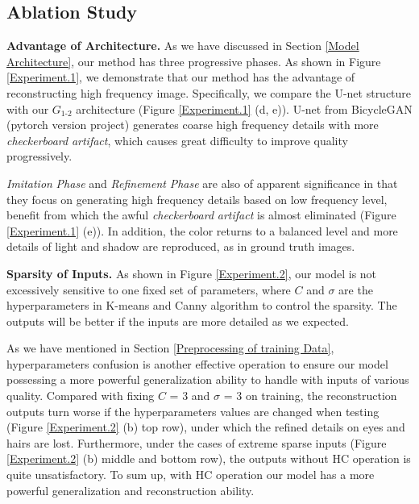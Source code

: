 \documentclass[10pt,twocolumn,letterpaper]{article} \usepackage{amsfonts,amssymb}
\begin{document}
\subsection{Ablation Study} \label{Ablation Study}
{\bf Advantage of Architecture.}
As we have discussed in Section \ref{Model Architecture}, our method has three progressive phases. As shown in Figure \ref{Experiment.1}, we demonstrate that our method has the advantage of reconstructing high frequency image. Specifically, we compare the U-net structure \cite{ronneberger2015u} with our $G_{1\text{-}2}$ architecture (Figure \ref{Experiment.1} (d, e)). U-net from BicycleGAN \cite{zhu2017toward} (pytorch version project) generates coarse high frequency details with more \emph{checkerboard}  \emph{artifact}, which causes great difficulty to improve quality pro\-gre\-ssive\-ly.

 \emph{Imitation} \emph{Phase} and \emph{Refinement} \emph{Phase} are also of appa\-rent significance in that they focus on generating high frequency details based on low frequency level, benefit from which the awful \emph{checkerboard} \emph{artifact} is almost eliminated (Figure \ref{Experiment.1} (e)). In addition, the color returns to a balanced level and more details of light and shadow are reproduced, as in ground truth images.

{\bf Sparsity of Inputs. }
As shown in Figure \ref{Experiment.2}, our model is not excessively sensitive to one fixed set of parameters,  where $C$ and $\sigma$ are the hyperparameters in K-means and Canny algorithm to control the sparsity. The outputs will be better if the inputs are more detailed as we expected.

As we have mentioned in Section \ref{Preprocessing of training Data}, hyperparameters confusion is another effective operation to ensure our model possessing a more powerful generalization ability to handle with inputs of various quality. Compared with fixing $C$ = 3 and $\sigma$ = 3 on training, the reconstruction outputs turn worse if the hyperparameters values are changed when testing (Figure \ref{Experiment.2} (b) top row), under which the refined details on eyes and hairs are lost. Furthermore, under the cases of extreme sparse inputs (Figure \ref{Experiment.2} (b) middle and bottom row), the outputs without HC operation is quite unsatisfactory. To sum up, with HC operation our model has a more powerful generalization and reconstruction ability.
\end{document}
